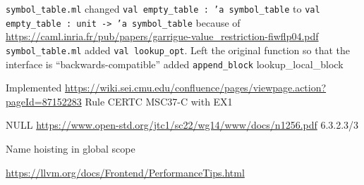 
\texttt{symbol_table.ml} changed \texttt{val empty_table : 'a symbol_table} to \texttt{val empty_table : unit -> 'a symbol_table} because of \url{https://caml.inria.fr/pub/papers/garrigue-value_restriction-fiwflp04.pdf}
\texttt{symbol_table.ml} added \texttt{val lookup_opt}. Left the original function so that the interface is ``backwards-compatible''
added \texttt{append_block}
lookup_local_block

Implemented \url{https://wiki.sei.cmu.edu/confluence/pages/viewpage.action?pageId=87152283} Rule CERTC MSC37-C with EX1

NULL \url{https://www.open-std.org/jtc1/sc22/wg14/www/docs/n1256.pdf} 6.3.2.3/3

Name hoisting in global scope

\url{https://llvm.org/docs/Frontend/PerformanceTips.html}